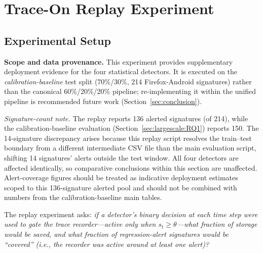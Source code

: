 \documentclass[a4paper,fleqn]{cas-sc}
\theoremstyle{plain}
\begin{document}
\section{Trace-On Replay Experiment}\label{sec:replay}

\subsection{Experimental Setup}\label{sec:replay:setup}

\textbf{Scope and data provenance.}
This experiment provides supplementary deployment evidence for the four
statistical detectors.
It is executed on the \emph{calibration-baseline} test split (70\%/30\%,
214 Firefox-Android signatures) rather than the canonical 60\%/20\%/20\%
pipeline; re-implementing it within the unified pipeline is recommended
future work (Section~\ref{sec:conclusion}).

\noindent\textit{Signature-count note.}
The replay reports 136 alerted signatures (of 214), while the
calibration-baseline evaluation (Section~\ref{sec:largescale:RQ1})
reports 150.
The 14-signature discrepancy arises because this replay script resolves
the train--test boundary from a different intermediate CSV file than the
main evaluation script, shifting 14 signatures' alerts outside the test
window.
All four detectors are affected identically, so comparative conclusions
within this section are unaffected.
Alert-coverage figures should be treated as indicative deployment estimates
scoped to this 136-signature alerted pool and should not be combined with
numbers from the calibration-baseline main tables.

The replay experiment asks: \emph{if a detector's binary decision at each
time step were used to gate the trace recorder---active only when $s_t \geq
\theta$---what fraction of storage would be saved, and what fraction of
regression-alert signatures would be ``covered'' (i.e., the recorder was
active around at least one alert)?}
\end{document}
